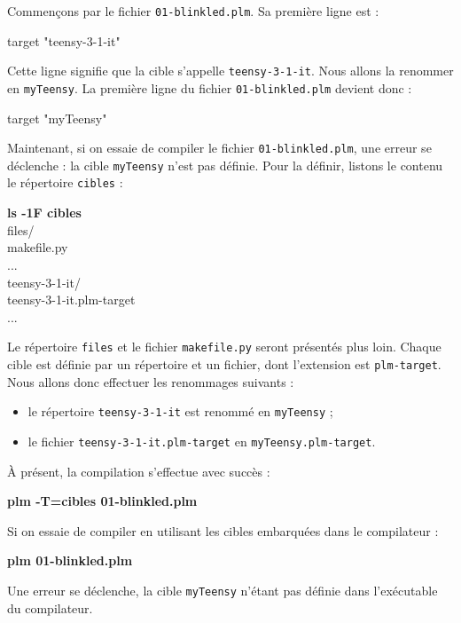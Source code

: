 Commençons par le fichier \texttt{01-blinkled.plm}. Sa première ligne est :
\begin{PLM}[1]
target "teensy-3-1-it"
\end{PLM}

Cette ligne signifie que la cible s'appelle \texttt{teensy-3-1-it}. Nous allons la renommer en \texttt{myTeensy}. La première ligne du fichier \texttt{01-blinkled.plm} devient donc :

\begin{PLM}[1]
target "myTeensy"
\end{PLM}

Maintenant, si on essaie de compiler le fichier \texttt{01-blinkled.plm}, une erreur se déclenche : la cible \texttt{myTeensy} n'est pas définie. Pour la définir, listons le contenu le répertoire \texttt{cibles} :
\begin{SHELL}
{\bfseries ls -1F cibles}\\
f{}iles/\\
makef{}ile.py\\
...\\
teensy-3-1-it/\\
teensy-3-1-it.plm-target\\
...
\end{SHELL}

Le répertoire \texttt{f{}iles} et le fichier \texttt{makef{}ile.py} seront présentés plus loin. Chaque cible est définie par un répertoire et un fichier, dont l'extension est \texttt{plm-target}. Nous allons donc effectuer les renommages suivants :
\begin{itemize}
  \item le répertoire \texttt{teensy-3-1-it} est renommé en \texttt{myTeensy} ;
  \item le fichier \texttt{teensy-3-1-it.plm-target} en \texttt{myTeensy.plm-target}.
\end{itemize}

À présent, la compilation s'effectue avec succès :
\begin{SHELL}
\bfseries plm -T=cibles 01-blinkled.plm
\end{SHELL}

Si on essaie de compiler en utilisant les cibles embarquées dans le compilateur :
\begin{SHELL}
\bfseries plm 01-blinkled.plm
\end{SHELL}

Une erreur se déclenche, la cible \texttt{myTeensy} n'étant pas définie dans l'exécutable du compilateur.






